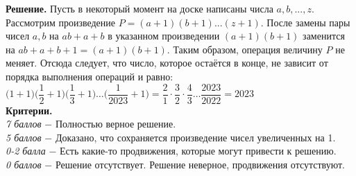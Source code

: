 \textbf{Решение.} Пусть в некоторый момент на доске написаны числа $a, b, ... , z.$ Рассмотрим произведение $ P = (a + 1)(b + 1)...(z + 1).$  После замены пары чисел $a, b$ на  $ab + a + b $ в указанном произведении  $(a + 1)(b + 1)$ заменится на  $ab + a + b + 1 = (a + 1)(b + 1)$.  Таким образом, операция величину $P$ не меняет. Отсюда следует, что число, которое остаётся в конце, не зависит от порядка выполнения операций и равно: \\

$\Biggl(1+1\Biggr)\Biggl(\dfrac{1}{2} + 1\Biggr)\Biggl(\dfrac{1}{3} + 1\Biggr) \dotsc \Biggl(\dfrac{1}{2023} + 1\Biggr) = \dfrac{2}{1} \cdot \dfrac{3}{2} \cdot \dfrac{4}{3} \dotsc \dfrac{2023}{2022} = 2023$ \\ 

\textbf{Критерии.} \\
\textit{7 баллов} $-$ Полностью верное решение. \\
\textit{5 баллов} $-$ Доказано, что сохраняется произведение чисел увеличенных на 1. \\
\textit{0-2 балла} $-$ Есть какие-то продвижения, которые могут привести к решению. \\ 
\textit{0 баллов} $-$ Решение отсутствует. Решение неверное, продвижения отсутствуют. \\ 

